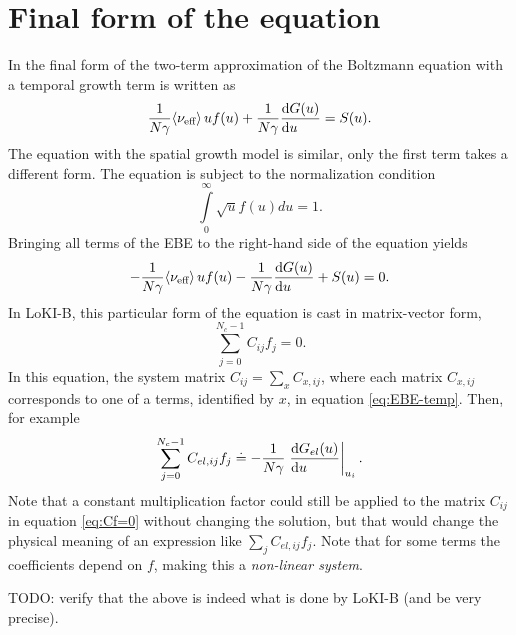 \documentclass{book}
\newcommand{\MEAN}[1]{\ensuremath{\!\left\langle{{#1}}\right\rangle}}
\begin{document}
\section{Final form of the equation}
In \cite[eqn. 3a]{Tejero2019} the final form of the two-term approximation of the
Boltzmann equation with a temporal growth term is written as
\begin{equation}
  \frac{1}{N\gamma}\MEAN{\nu_{\text{eff}}}uf(u) + \frac{1}{N\gamma}\DERIV{G(u)}{u} = S(u).
\end{equation}
The equation with the spatial growth model is similar, only the first term takes
a different form. The equation is subject to the normalization condition
\begin{equation}
  \int\limits_0^\infty \sqrt{u}f(u)du=1.
  \label{eq:f-norm}
\end{equation}
Bringing all terms of the EBE to the right-hand side of the equation yields
\begin{equation}
  -\frac{1}{N\gamma}\MEAN{\nu_{\text{eff}}}uf(u) - \frac{1}{N\gamma}\DERIV{G(u)}{u} + S(u) = 0.
  \label{eq:EBE-temp}
\end{equation}
In LoKI-B, this particular form of the equation is cast in matrix-vector form,
\begin{equation}
  \sum\limits_{j=0}^{N_c-1}C_{ij}f_j = 0.
  \label{eq:Cf=0}
\end{equation}
In this equation, the system matrix $C_{ij}=\sum_x C_{x,ij}$, where each
matrix $C_{x,ij}$ corresponds to one of a terms, identified by $x$, in
equation \eqref{eq:EBE-temp}. Then, for example
\[
   \sum\limits_{j=0}^{N_c-1}C_{el,ij}f_j
   \doteq
   -\frac{1}{N\gamma}\left.\DERIV{G_{el}(u)}{u}\right|_{u_i}.
\]
Note that a constant multiplication factor could still be applied to the matrix
$C_{ij}$ in equation \eqref{eq:Cf=0} without changing the solution, but that
would change the physical meaning of an expression like $\sum_jC_{el,ij}f_j$.
Note that for some terms the coefficients depend on $f$, making this a
{\em non-linear system}.

TODO: verify that the above is indeed what is done by LoKI-B (and be very precise).
\end{document}
